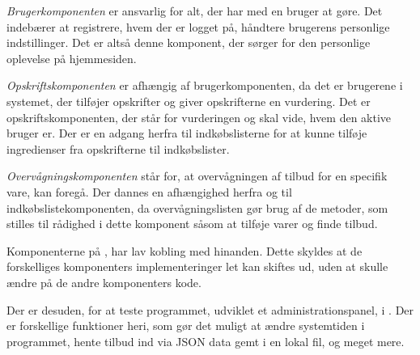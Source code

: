 \textit{Brugerkomponenten} er ansvarlig for alt, der har med en bruger at gøre. 
Det indebærer at registrere, hvem der er logget på, håndtere brugerens personlige indstillinger. 
Det er altså denne komponent, der sørger for den personlige oplevelse på hjemmesiden.

\textit{Opskriftskomponenten} er afhængig af brugerkomponenten, da det er brugerene i systemet, der tilføjer opskrifter og giver opskrifterne en vurdering.
Det er opskriftskomponenten, der står for vurderingen og skal vide, hvem den aktive bruger er.
Der er en adgang herfra til indkøbslisterne for at kunne tilføje ingredienser fra opskrifterne til indkøbslister.

\textit{Overvågningskomponenten} står for, at overvågningen af tilbud for en specifik vare, kan foregå.
Der dannes en afhængighed herfra og til indkøbslistekomponenten, da overvågningslisten gør brug af de metoder, som stilles til rådighed i dette komponent såsom at tilføje varer og finde tilbud.

Komponenterne på , har lav kobling med hinanden.
Dette skyldes at de forskelliges komponenters implementeringer let kan skiftes ud, uden at skulle ændre på de andre komponenters kode.


Der er desuden, for at teste programmet, udviklet et administrationspanel, i . 
Der er forskellige funktioner heri, som gør det muligt at ændre systemtiden i programmet, hente tilbud ind via JSON data gemt i en lokal fil, og meget mere.


